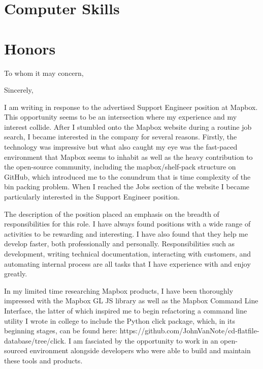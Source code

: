 \documentclass[11pt,a4paper,sans]{moderncv}        %
\begin{document}
\section{Computer Skills}

\section{Honors}

\clearpage
\date{October 9, 2016}
\opening{To whom it may concern,}
\closing{Sincerely,}

\makelettertitle

I am writing in response to the advertised Support Engineer position at Mapbox. This opportunity seems to be an intersection where my experience and my interest collide. After I stumbled onto the Mapbox website during a routine job search, I became interested in the company for several reasons. Firstly, the technology was impressive but what also caught my eye was the fast-paced environment that Mapbox seems to inhabit as well as the heavy contribution to the open-source community, including the mapbox/shelf-pack structure on GitHub, which introduced me to the conundrum that is time complexity of the bin packing problem. When I reached the Jobs section of the website I became particularly interested in the Support Engineer position. 

The description of the position placed an emphasis on the breadth of responsibilities for this role. I have always found positions with a wide range of activities to be rewarding and interesting. I have also found that they help me develop faster, both professionally and personally. Responsibilities such as development, writing technical documentation, interacting with customers, and automating internal process are all tasks that I have experience with and enjoy greatly.

In my limited time researching Mapbox products, I have been thoroughly impressed with the Mapbox GL JS library as well as the Mapbox Command Line Interface, the latter of which inspired me to begin refactoring a command line utility I wrote in college to include the Python click package, which, in its beginning stages, can be found here: https://github.com/JohnVanNote/cd-flatfile-database/tree/click. I am fasciated by the opportunity to work in an open-sourced environment alongside developers who were able to build and maintain these tools and products.
\end{document}
